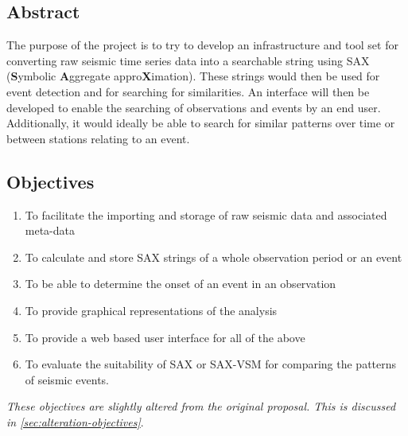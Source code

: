 \documentclass[../report.tex]{subfiles}
\begin{document}
\subsection*{Abstract}

	The purpose of the project is to try to develop an infrastructure and tool set for converting raw seismic time series data into a searchable string using SAX (\textbf{S}ymbolic \textbf{A}ggregate appro\textbf{X}imation).  These strings would then be used for event detection and for searching for similarities. An interface will then be developed to enable the searching of observations and events by an end user.  Additionally, it would ideally be able to search for similar patterns over time or between stations relating to an event.
	
\subsection*{Objectives} \label{sec:objectives}
	\begin{enumerate}
		\item To facilitate the importing and storage of raw seismic data and associated meta-data
		\item To calculate and store SAX strings of a whole observation period or an event
		\item To be able to determine the onset of an event in an observation
		\item To provide graphical representations of the analysis
		\item To provide a web based user interface for all of the above
		\item To evaluate the suitability of SAX or SAX-VSM for comparing the patterns of seismic events.
	\end{enumerate}

	\textit{These objectives are slightly altered from the original proposal.  This is discussed in \cref{sec:alteration-objectives}}.
		
\end{document}
